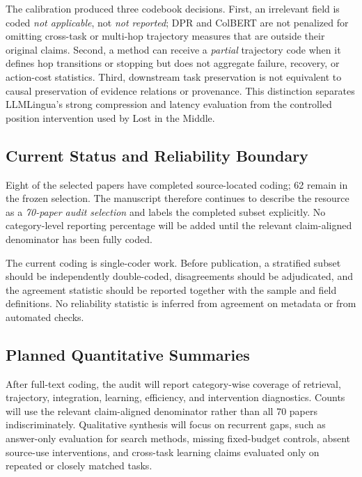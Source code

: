 The calibration produced three codebook decisions. First, an irrelevant field is coded \emph{not applicable}, not \emph{not reported}; DPR and ColBERT are not penalized for omitting cross-task or multi-hop trajectory measures that are outside their original claims. Second, a method can receive a \emph{partial} trajectory code when it defines hop transitions or stopping but does not aggregate failure, recovery, or action-cost statistics. Third, downstream task preservation is not equivalent to causal preservation of evidence relations or provenance. This distinction separates LLMLingua's strong compression and latency evaluation from the controlled position intervention used by Lost in the Middle.

\subsection{Current Status and Reliability Boundary}
Eight of the \AuditSize{} selected papers have completed source-located coding; 62 remain in the frozen selection. The manuscript therefore continues to describe the resource as a \emph{70-paper audit selection} and labels the completed subset explicitly. No category-level reporting percentage will be added until the relevant claim-aligned denominator has been fully coded.

The current coding is single-coder work. Before publication, a stratified subset should be independently double-coded, disagreements should be adjudicated, and the agreement statistic should be reported together with the sample and field definitions. No reliability statistic is inferred from agreement on metadata or from automated checks.

\subsection{Planned Quantitative Summaries}
After full-text coding, the audit will report category-wise coverage of retrieval, trajectory, integration, learning, efficiency, and intervention diagnostics. Counts will use the relevant claim-aligned denominator rather than all 70 papers indiscriminately. Qualitative synthesis will focus on recurrent gaps, such as answer-only evaluation for search methods, missing fixed-budget controls, absent source-use interventions, and cross-task learning claims evaluated only on repeated or closely matched tasks.
